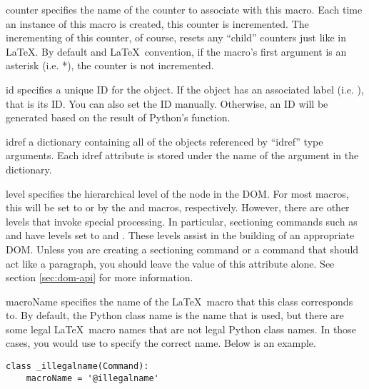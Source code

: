 \begin{memberdesc}[Macro]{counter}
specifies the name of the counter to associate with this macro.  Each time
an instance of this macro is created, this counter is incremented.  
The incrementing of this counter, of course, resets any ``child'' counters
just like in \LaTeX.  By default and \LaTeX\ convention, if the macro's first 
argument is an asterisk (i.e. *), the counter is not incremented.
\end{memberdesc}

\begin{memberdesc}[Macro]{id}
specifies a unique ID for the object.  If the object has an associated 
label (i.e. ), that is its ID.  You can also set the ID 
manually.  Otherwise, an ID will be generated based on the result of Python's
 function.
\end{memberdesc}

\begin{memberdesc}[Macro]{idref}
a dictionary containing all of the objects referenced by ``idref'' type
arguments.  Each idref attribute is stored under the name of the 
argument in the  dictionary.
\end{memberdesc}

\begin{memberdesc}[Macro]{level}
specifies the hierarchical level of the node in the DOM.  For most macros,
this will be set to  or 
 by the  and 
macros, respectively.  However, there are other levels that invoke special
processing.  In particular, sectioning commands such as  and
 have levels set to  and 
.  These levels assist in the building of 
an appropriate DOM.  Unless you are creating a sectioning command or a command
that should act like a paragraph, you should leave the value of this attribute
alone.  See section \ref{sec:dom-api} for more information.
\end{memberdesc}

\begin{memberdesc}[Macro]{macroName}
specifies the name of the \LaTeX\ macro that this class corresponds to.  
By default, the Python class name is the name that is used, but there are
some legal \LaTeX\ macro names that are not legal Python class names.
In those cases, you would use  to specify the correct
name.  Below is an example.
\begin{verbatim}
class _illegalname(Command):
    macroName = '@illegalname'
\end{verbatim}
\end{memberdesc}

